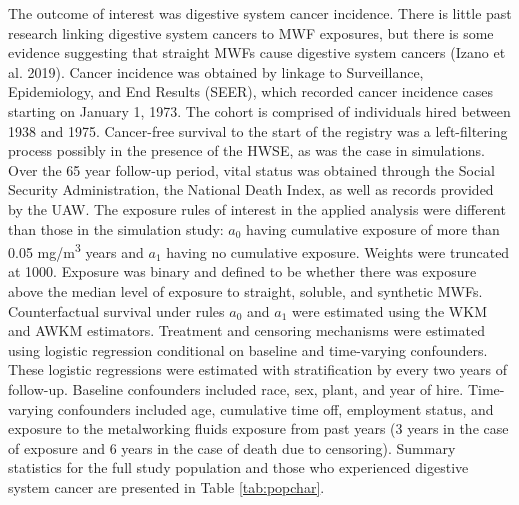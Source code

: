 \documentclass[
  11pt,
]{article}
\begin{document}
The outcome of interest was digestive system cancer incidence. There is
little past research linking digestive system cancers to MWF exposures,
but there is some evidence suggesting that straight MWFs cause digestive
system cancers (Izano et al. 2019). Cancer incidence was obtained by
linkage to Surveillance, Epidemiology, and End Results (SEER), which
recorded cancer incidence cases starting on January 1, 1973. The cohort
is comprised of individuals hired between 1938 and 1975. Cancer-free
survival to the start of the registry was a left-filtering process
possibly in the presence of the HWSE, as was the case in simulations.
Over the 65 year follow-up period, vital status was obtained through the
Social Security Administration, the National Death Index, as well as
records provided by the UAW. The exposure rules of interest in the
applied analysis were different than those in the simulation study:
\(a_0\) having cumulative exposure of more than 0.05
mg/m\textsuperscript{3} years and \(a_1\) having no cumulative exposure.
Weights were truncated at 1000. Exposure was binary and defined to be
whether there was exposure above the median level of exposure to
straight, soluble, and synthetic MWFs. Counterfactual survival under
rules \(a_0\) and \(a_1\) were estimated using the WKM and AWKM
estimators. Treatment and censoring mechanisms were estimated using
logistic regression conditional on baseline and time-varying
confounders. These logistic regressions were estimated with
stratification by every two years of follow-up. Baseline confounders
included race, sex, plant, and year of hire. Time-varying confounders
included age, cumulative time off, employment status, and exposure to
the metalworking fluids exposure from past years (3 years in the case of
exposure and 6 years in the case of death due to censoring). Summary
statistics for the full study population and those who experienced
digestive system cancer are presented in Table \ref{tab:popchar}.
\end{document}
